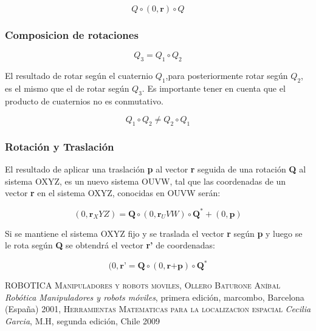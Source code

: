 \documentclass[letterpaper, openright, 12pt, spanish]{report}
\begin{document}
\begin{displaymath}
Q\circ (0,\textbf{r})\circ Q
\end{displaymath}

\subsubsection{Composicion de rotaciones}

\begin{displaymath}
Q_3=Q_1\circ Q_2
\end{displaymath}

El resultado de rotar seg\'un el cuaternio $Q_1$,para posteriormente rotar seg\'un $Q_2$, es el mismo que el de rotar seg\'un  $Q_3$. Es importante tener en cuenta que el producto de cuaternios no es conmutativo.

\begin{displaymath}
Q_1 \circ Q_2\neq Q_2\circ Q_1
\end{displaymath}

\subsubsection{Rotaci\'on y Traslaci\'on}

El resultado de aplicar una traslaci\'on \textbf{p} al vector \textbf{r} seguida de una rotaci\'on \textbf{Q} al sistema OXYZ, es un nuevo sistema OUVW, tal que las coordenadas de un vector \textbf{r} en el sistema OXYZ, conocidas en OUVW ser\'an:

\begin{displaymath}
(0, \textbf{r}_XYZ)=\textbf{Q}\circ (0, \textbf{r}_UVW)\circ \textbf{Q}^*+(0, \textbf{p})
\end{displaymath}

Si se mantiene el sistema OXYZ fijo y se traslada el vector \textbf{r} seg\'un \textbf{p} y luego se le rota seg\'un \textbf{Q} se obtendr\'a el vector \textbf{r'} de coordenadas:

\begin{displaymath}
(0, \textbf{r'}=\textbf{Q}\circ (0,\textbf{r+p})\circ \textbf{Q}^*
\end{displaymath}

\newpage

\begin{thebibliography}{X}
\textsc{ROBOTICA Manipuladores y robots moviles, Ollero Baturone An\'ibal} \textit{Rob\'otica Manipuladores y robots m\'oviles}, primera edici\'on, marcombo, Barcelona (España) 2001,    
\textsc{Herramientas Matematicas para la localizacion espacial} \textit{Cecilia Garcia}, M.H, segunda edici\'on, Chile 2009 
\end{thebibliography}
\end{document}
